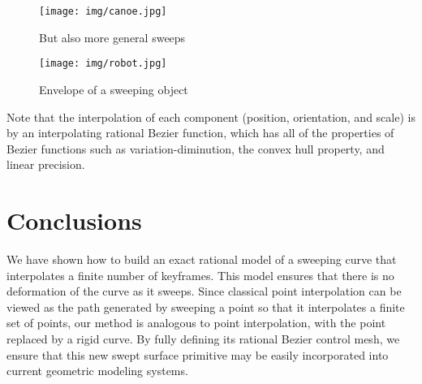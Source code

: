 \documentclass[times]{article}
\begin{document}
\begin{figure}
\begin{center}
\texttt{[image: img/canoe.jpg]}
\end{center}
\caption{But also more general sweeps}
\label{fig:canoe}
\end{figure}

\begin{figure}
\begin{center}
\texttt{[image: img/robot.jpg]}
\end{center}
\caption{Envelope of a sweeping object}
\label{fig:robot}
\end{figure}


Note that the interpolation of each component (position, orientation,
and scale) is by an interpolating 
rational Bezier function, which has all of the properties of Bezier
functions such as variation-diminution, the convex hull property,
and linear precision.

\section{Conclusions}

We have shown how to build an exact rational model of a sweeping curve
that interpolates a finite number of keyframes.
This model ensures that there is no deformation of the curve as it sweeps.
Since classical point interpolation can be viewed as the path generated
by sweeping a point so that it interpolates a finite set of points,
our method is analogous to point interpolation, with the point replaced
by a rigid curve.
By fully defining its rational Bezier control mesh, we ensure that
this new swept surface primitive may be easily incorporated into
current geometric modeling systems.

\end{document}
